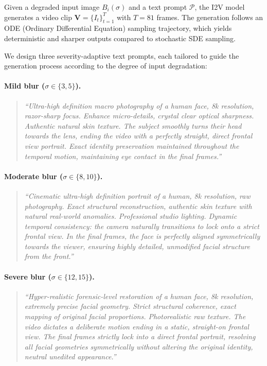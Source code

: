 Given a degraded input image $B_i(\sigma)$ and a text prompt
$\mathcal{P}$, the I2V model generates a video clip
$\mathbf{V} = \{I_t\}_{t=1}^{T}$ with $T = 81$ frames.
The generation follows an ODE (Ordinary Differential Equation)
sampling trajectory, which yields deterministic and sharper outputs
compared to stochastic SDE sampling.

We design three severity-adaptive text prompts, each tailored to
guide the generation process according to the degree of input
degradation:

\paragraph{Mild blur ($\sigma \in \{3, 5\}$).}
\begin{quote}\small\itshape
``Ultra-high definition macro photography of a human face, 8k
resolution, razor-sharp focus. Enhance micro-details, crystal clear
optical sharpness. Authentic natural skin texture. The subject
smoothly turns their head towards the lens, ending the video with
a perfectly straight, direct frontal view portrait. Exact identity
preservation maintained throughout the temporal motion, maintaining
eye contact in the final frames.''
\end{quote}

\paragraph{Moderate blur ($\sigma \in \{8, 10\}$).}
\begin{quote}\small\itshape
``Cinematic ultra-high definition portrait of a human, 8k resolution,
raw photography. Exact structural reconstruction, authentic skin
texture with natural real-world anomalies. Professional studio
lighting. Dynamic temporal consistency: the camera naturally
transitions to lock onto a strict frontal view. In the final frames,
the face is perfectly aligned symmetrically towards the viewer,
ensuring highly detailed, unmodified facial structure from the front.''
\end{quote}

\paragraph{Severe blur ($\sigma \in \{12, 15\}$).}
\begin{quote}\small\itshape
``Hyper-realistic forensic-level restoration of a human face, 8k
resolution, extremely precise facial geometry. Strict structural
coherence, exact mapping of original facial proportions. Photorealistic
raw texture. The video dictates a deliberate motion ending in a static,
straight-on frontal view. The final frames strictly lock into a direct
frontal portrait, resolving all facial geometries symmetrically without
altering the original identity, neutral unedited appearance.''
\end{quote}

